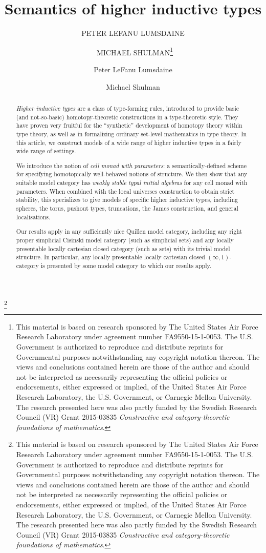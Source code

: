 \title{Semantics of higher inductive types}

\newcommand{\thankstext}{This material is based on research sponsored by The United States Air Force Research Laboratory under agreement number FA9550-15-1-0053.  The U.S. Government is authorized to reproduce and distribute reprints for Governmental purposes notwithstanding any copyright notation thereon.  The views and conclusions contained herein are those of the author and should not be interpreted as necessarily representing the official policies or endorsements, either expressed or implied, of the United States Air Force Research Laboratory, the U.S. Government, or Carnegie Mellon University.
  The research presented here was also partly funded by the Swedish Research Council (VR) Grant 2015-03835 \emph{Constructive and category-theoretic foundations of mathematics}.}
\ifmpcps
  \author[Peter LeFanu Lumsdaine and Michael Shulman]{PETER LEFANU LUMSDAINE \and\ MICHAEL SHULMAN\thanks{\thankstext}}
\else
  \author{Peter LeFanu Lumsdaine}
  \author{Michael Shulman}
  \thanks{\thankstext}
\fi



\maketitle

\ifmpcps
\else
 \vspace{-1.7\baselineskip} %
\fi

\begin{abstract}
  \emph{Higher inductive types} are a class of type-forming rules, introduced to provide basic (and not-so-basic) homotopy-theoretic constructions in a type-theoretic style.
  They have proven very fruitful for the ``synthetic'' development of homotopy theory within type theory, as well as in formalizing ordinary set-level mathematics in type theory.
  In this article, we construct models of a wide range of higher inductive types in a fairly wide range of settings.
  
  We introduce the notion of \emph{cell monad with parameters}: a semantically-defined scheme for specifying homotopically well-behaved notions of structure.
  We then show that any suitable model category has \emph{weakly stable typal initial algebras} for any cell monad with parameters.
  When combined with the local universes construction to obtain strict stability, this specializes to give models of specific higher inductive types, including spheres, the torus, pushout types, truncations, the James construction, and general localisations.

  Our results apply in any sufficiently nice Quillen model category, including any right proper simplicial Cisinski model category (such as simplicial sets) and any locally presentable locally cartesian closed category (such as sets) with its trivial model structure.
  In particular, any locally presentable locally cartesian closed $(\infty,1)$-category is presented by some model category to which our results apply.
\end{abstract}

